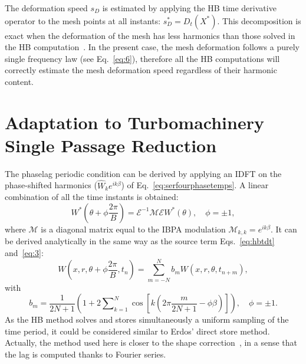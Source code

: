 The deformation speed $s_D$ is estimated by applying the HB time
derivative operator to the mesh points at all instants:
$s_D^*=D_t(X^*)$. This decomposition is exact when the
deformation of the mesh has less harmonics than those solved in the
HB computation~\cite{JDufour2009}. In the present case, the mesh
deformation follows a purely single frequency law (see
Eq.~\eqref{eq:6}), therefore all the HB computations will correctly
estimate the mesh deformation speed regardless of their harmonic content.

\section{Adaptation to Turbomachinery Single Passage Reduction}
\label{sec:Adptatreduction}

The phaselag periodic condition can be derived by applying an
IDFT on the phase-shifted harmonics ($\widehat{W}_ke^{ik\beta}$) of
Eq.~\eqref{eq:serfourphasetemps}. A linear
combination of all the time instants is obtained:
\begin{equation}
  W^*\left(\theta+\phi\frac{2\pi}{B}\right)=\mathcal{E}^{-1}\mathcal{M}\mathcal{E}W^*(\theta),\quad \phi=\pm 1,
\end{equation}
where $\mathcal{M}$ is a diagonal matrix equal to the IBPA modulation
$\mathcal{M}_{k,k}=e^{i k\beta}$. It can be derived
analytically in the same way as the source term Eqs.~\eqref{eq:hbtdt}
and~\eqref{eq:3}:
\begin{equation}
  W\left(x, r, \theta+\phi\frac{2\pi}{B}, t_n\right) =\sum_{m=-N}^N
  b_mW(x, r, \theta, t_{n+m}), 
\end{equation}
with
\begin{equation}
  b_m=\frac{1}{2N+1}\left(1+2\sum\nolimits_{k=1}^N\cos\left[k\left(2\pi
        \frac{m}{2N+1}-\phi \beta\right)\right]\right),\quad \phi=\pm 1.
\end{equation}
As the HB method solves and stores simultaneously a uniform sampling
of the time period, it could be considered similar to Erdos' direct
store method. Actually, the method used here is closer to the shape
correction~\cite{He1990}, in a sense that the lag is
computed thanks to Fourier series.
